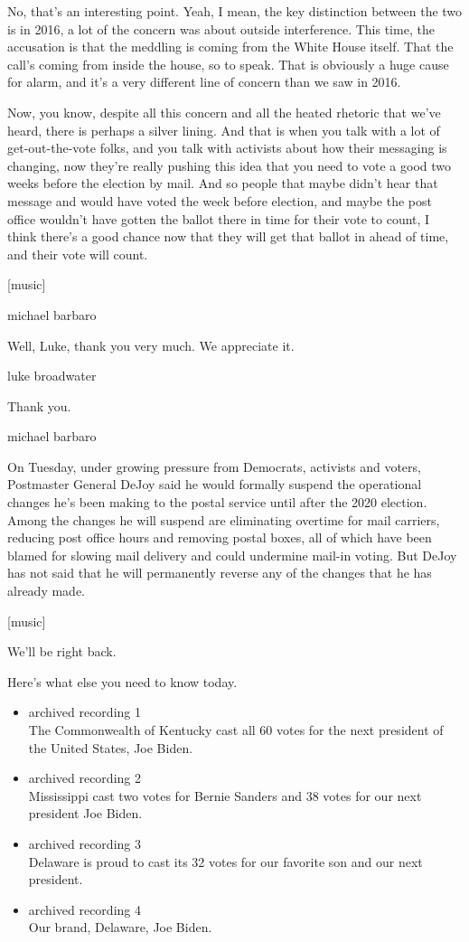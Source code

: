 No, that's an interesting point. Yeah, I mean, the key distinction
between the two is in 2016, a lot of the concern was about outside
interference. This time, the accusation is that the meddling is coming
from the White House itself. That the call's coming from inside the
house, so to speak. That is obviously a huge cause for alarm, and it's a
very different line of concern than we saw in 2016.

Now, you know, despite all this concern and all the heated rhetoric that
we've heard, there is perhaps a silver lining. And that is when you talk
with a lot of get-out-the-vote folks, and you talk with activists about
how their messaging is changing, now they're really pushing this idea
that you need to vote a good two weeks before the election by mail. And
so people that maybe didn't hear that message and would have voted the
week before election, and maybe the post office wouldn't have gotten the
ballot there in time for their vote to count, I think there's a good
chance now that they will get that ballot in ahead of time, and their
vote will count.

{[}music{]}

michael barbaro

Well, Luke, thank you very much. We appreciate it.

luke broadwater

Thank you.

michael barbaro

On Tuesday, under growing pressure from Democrats, activists and voters,
Postmaster General DeJoy said he would formally suspend the operational
changes he's been making to the postal service until after the 2020
election. Among the changes he will suspend are eliminating overtime for
mail carriers, reducing post office hours and removing postal boxes, all
of which have been blamed for slowing mail delivery and could undermine
mail-in voting. But DeJoy has not said that he will permanently reverse
any of the changes that he has already made.

{[}music{]}

We'll be right back.

Here's what else you need to know today.

\begin{itemize}
\item
  archived recording 1\\
  The Commonwealth of Kentucky cast all 60 votes for the next president
  of the United States, Joe Biden.
\item
  archived recording 2\\
  Mississippi cast two votes for Bernie Sanders and 38 votes for our
  next president Joe Biden.
\item
  archived recording 3\\
  Delaware is proud to cast its 32 votes for our favorite son and our
  next president.
\item
  archived recording 4\\
  Our brand, Delaware, Joe Biden.
\end{itemize}

